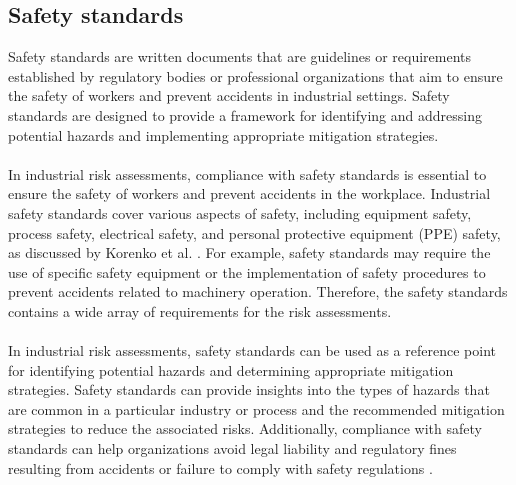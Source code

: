 \subsection{Safety standards} \label{standards}
Safety standards are written documents that are guidelines or requirements established by regulatory bodies or professional organizations that aim to ensure the safety of workers and prevent accidents in industrial settings. Safety standards are designed to provide a framework for identifying and addressing potential hazards and implementing appropriate mitigation strategies.

\paragraph{} In industrial risk assessments, compliance with safety standards is essential to ensure the safety of workers and prevent accidents in the workplace. Industrial safety standards cover various aspects of safety, including equipment safety, process safety, electrical safety, and personal protective equipment (PPE) safety, as discussed by Korenko et al. \cite{Korenko}. For example, safety standards may require the use of specific safety equipment or the implementation of safety procedures to prevent accidents related to machinery operation. Therefore, the safety standards contains a wide array of requirements for the risk assessments. 

\paragraph{} In industrial risk assessments, safety standards can be used as a reference point for identifying potential hazards and determining appropriate mitigation strategies. Safety standards can provide insights into the types of hazards that are common in a particular industry or process and the recommended mitigation strategies to reduce the associated risks. Additionally, compliance with safety standards can help organizations avoid legal liability and regulatory fines resulting from accidents or failure to comply with safety regulations \cite{Pacaiova}.

